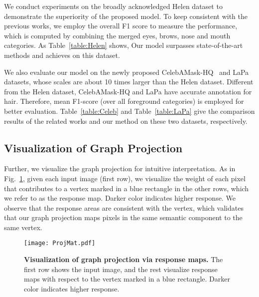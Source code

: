 \documentclass[runningheads]{llncs}
\begin{document}
We conduct experiments on the broadly acknowledged Helen dataset to demonstrate the superiority of the proposed model. 
To keep consistent with the previous works\cite{liu2017face,lin2019face,wei2019accurate,yin2020end,liu2020new}, we employ the overall F1 score to measure the performance, which is computed by combining the merged eyes, brows, nose and mouth categories. As Table~\ref{table:Helen} shows, Our model surpasses state-of-the-art methods and achieves  on this dataset. 


We also evaluate our model on the newly proposed CelebAMask-HQ~\cite{CelebAMask-HQ} and LaPa~\cite{liu2020new} datasets, whose scales are about 10 times larger than the Helen dataset. Different from the Helen dataset, CelebAMask-HQ and LaPa have accurate annotation for hair. Therefore, mean F1-score (over all foreground categories) is employed for better evaluation. Table~\ref{table:Celeb} and Table~\ref{table:LaPa} give the comparison results of the related works and our method on these two datasets, respectively.













\subsection{Visualization of Graph Projection}

Further, we visualize the graph projection for intuitive interpretation. 
As in Fig.~\ref{fig:mat_vis}, given each input image (first row), we visualize the weight of each pixel that contributes to a vertex marked in a blue rectangle in the other rows, which we refer to as the response map. 
Darker color indicates higher response. 
We observe that the response areas are consistent with the vertex, which validates that our graph projection maps pixels in the same semantic component to the same vertex. 




\begin{figure}[t]
    \centering
    \texttt{[image: ProjMat.pdf]}
    \caption{\textbf{Visualization of graph projection via response maps.} The first row shows the input image, and the rest visualize response maps with respect to the vertex marked in a blue rectangle. Darker color indicates higher response.  }
    \label{fig:mat_vis}
\end{figure}
\end{document}
